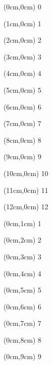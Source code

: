 \begin{frame}
	
	\begin{textblock*}{0cm}(0cm,0cm)
		0
	\end{textblock*}
	
	\begin{textblock*}{0cm}(1cm,0cm)
		1
	\end{textblock*}
	\begin{textblock*}{0cm}(2cm,0cm)
		2
	\end{textblock*}
	\begin{textblock*}{0cm}(3cm,0cm)
		3
	\end{textblock*}
	\begin{textblock*}{0cm}(4cm,0cm)
		4
	\end{textblock*}
	\begin{textblock*}{0cm}(5cm,0cm)
		5
	\end{textblock*}
	\begin{textblock*}{0cm}(6cm,0cm)
		6
	\end{textblock*}
	\begin{textblock*}{0cm}(7cm,0cm)
		7
	\end{textblock*}
	\begin{textblock*}{0cm}(8cm,0cm)
		8
	\end{textblock*}
	\begin{textblock*}{0cm}(9cm,0cm)
		9
	\end{textblock*}
	\begin{textblock*}{0cm}(10cm,0cm)
		10
	\end{textblock*}
	\begin{textblock*}{0cm}(11cm,0cm)
		11
	\end{textblock*}
	\begin{textblock*}{0cm}(12cm,0cm)
		12
	\end{textblock*}
	
	\begin{textblock*}{0cm}(0cm,1cm)
		1
	\end{textblock*}
	\begin{textblock*}{0cm}(0cm,2cm)
		2
	\end{textblock*}
	\begin{textblock*}{0cm}(0cm,3cm)
		3
	\end{textblock*}
	\begin{textblock*}{0cm}(0cm,4cm)
		4
	\end{textblock*}
	\begin{textblock*}{0cm}(0cm,5cm)
		5
	\end{textblock*}
	\begin{textblock*}{0cm}(0cm,6cm)
		6
	\end{textblock*}
	\begin{textblock*}{0cm}(0cm,7cm)
		7
	\end{textblock*}
	\begin{textblock*}{0cm}(0cm,8cm)
		8
	\end{textblock*}
	\begin{textblock*}{0cm}(0cm,9cm)
		9
	\end{textblock*}
	

\end{frame}
